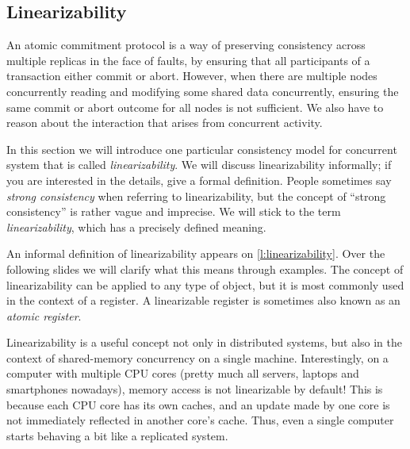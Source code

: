 \subsection{Linearizability}\label{sec:linearizability}

An atomic commitment protocol is a way of preserving consistency across multiple replicas in the face of faults, by ensuring that all participants of a transaction either commit or abort.
However, when there are multiple nodes concurrently reading and modifying some shared data concurrently, ensuring the same commit or abort outcome for all nodes is not sufficient.
We also have to reason about the interaction that arises from concurrent activity.

In this section we will introduce one particular consistency model for concurrent system that is called \emph{linearizability}.
We will discuss linearizability informally; if you are interested in the details, \cite{Herlihy:1990} give a formal definition.
People sometimes say \emph{strong consistency} when referring to linearizability, but the concept of ``strong consistency'' is rather vague and imprecise.
We will stick to the term \emph{linearizability}, which has a precisely defined meaning.

An informal definition of linearizability appears on \autoref{l:linearizability}.
Over the following slides we will clarify what this means through examples.
The concept of linearizability can be applied to any type of object, but it is most commonly used in the context of a register.
A linearizable register is sometimes also known as an \emph{atomic register}.

Linearizability is a useful concept not only in distributed systems, but also in the context of shared-memory concurrency on a single machine.
Interestingly, on a computer with multiple CPU cores (pretty much all servers, laptops and smartphones nowadays), memory access is not linearizable by default!
This is because each CPU core has its own caches, and an update made by one core is not immediately reflected in another core's cache.
Thus, even a single computer starts behaving a bit like a replicated system.

